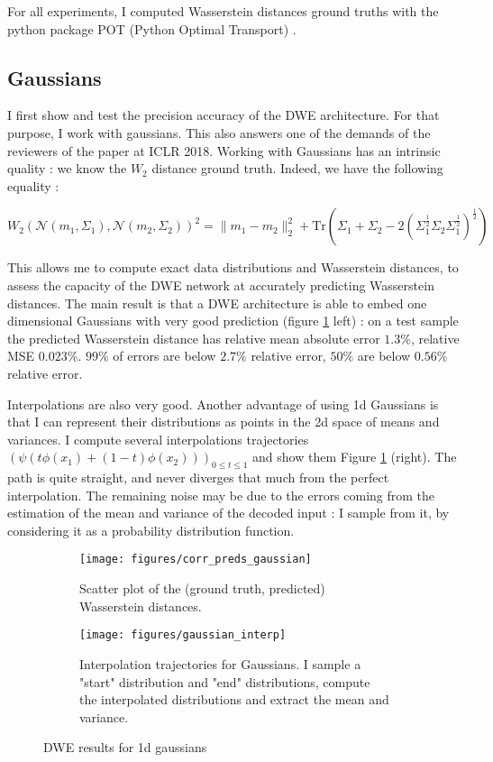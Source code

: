 \documentclass{article}
\begin{document}
For all experiments, I computed Wasserstein distances ground truths with the python package POT (Python Optimal Transport) \cite{flamary2017pot}.

\subsection{Gaussians}

I first show and test the precision accuracy of the DWE architecture. For that purpose, I work with gaussians. This also answers one of the demands of the reviewers of the paper at ICLR 2018. Working with Gaussians has an intrinsic quality : we know the $W_2$ distance ground truth. Indeed, we have the following equality :

$$
W_2(\mathcal{N}(m_1, \Sigma_1), \mathcal{N}(m_2, \Sigma_2))^2 = \| m_1 - m_2 \|_2^2 + \text{Tr}(\Sigma_1 + \Sigma_2 - 2(\Sigma_1^{\frac{1}{2}}\Sigma_2\Sigma_1^{\frac{1}{2}})^{\frac{1}{2}})
$$

This allows me to compute exact data distributions and Wasserstein distances, to assess the capacity of the DWE network at accurately predicting Wasserstein distances. The main result is that a DWE architecture is able to embed one dimensional Gaussians with very good prediction (figure \ref{fig:gaussian_interp} left) : on a test sample the predicted Wasserstein distance has relative mean absolute error $1.3\%$, relative MSE $0.023\%$. $99\%$ of errors are below $2.7\%$ relative error, $50\%$ are below $0.56\%$ relative error.

Interpolations are also very good. Another advantage of using 1d Gaussians is that I can represent their distributions as points in the 2d space of means and variances. I compute several interpolations trajectories $(\psi(t\phi(x_1) + (1-t)\phi(x_2)))_{0 \leq t \leq 1}$ and show them Figure \ref{fig:gaussian_interp} (right). The path is quite straight, and never diverges that much from the perfect interpolation. The remaining noise may be due to the errors coming from the estimation of the mean and variance of the decoded input : I sample from it, by considering it as a probability distribution function.

\begin{figure}[!htb]
	\centering
	\begin{subfigure}{.5\textwidth}
		\centering \texttt{[image: figures/corr\_preds\_gaussian]}
		\caption{Scatter plot of the (ground truth, predicted) Wasserstein distances.}
	\end{subfigure}%
	\begin{subfigure}{.5\textwidth}
		\centering \texttt{[image: figures/gaussian\_interp]}
		\caption{Interpolation trajectories for Gaussians. I sample a "start" distribution and "end" distributions, compute the interpolated distributions and extract the mean and variance.}
	\end{subfigure}
	\caption{DWE results for 1d gaussians}
	\label{fig:gaussian_interp}
\end{figure}
\end{document}
